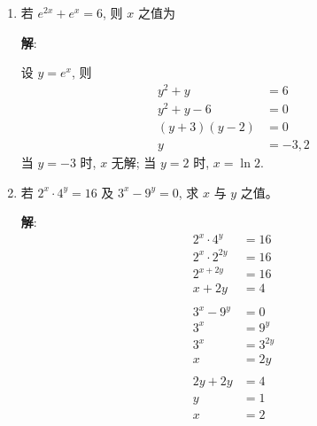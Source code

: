 \documentclass{report}
\newcommand{\sol}{\vspace{0.2cm}\textbf{解}:}
\begin{document}
\begin{multicols*}{2}
\begin{enumerate}
              \sol{}
              \begin{align*}
                  32^x   & = 16           \\
                  2^{5x} & = 2^4          \\
                  5x     & = 4            \\
                  x      & = \dfrac{4}{5}
              \end{align*}

        \item 若 $e^{2 x}+e^x=6$, 则 $x$ 之值为

              \sol{}

              设 $y = e^x$, 则
              \begin{align*}
                  y^2 + y        & = 6     \\
                  y^2 + y - 6    & = 0     \\
                  (y + 3)(y - 2) & = 0     \\
                  y              & = -3, 2
              \end{align*}
              当 $y = -3$ 时, $x$ 无解; 当 $y = 2$ 时, $x = \ln 2$.

        \item 若 $2^x \cdot 4^y=16$ 及 $3^x-9^y=0$, 求 $x$ 与 $y$ 之值。

              \sol{}
              \begin{align*}
                  2^x \cdot 4^y    & = 16     \\
                  2^x \cdot 2^{2y} & = 16     \\
                  2^{x+2y}         & = 16     \\
                  x + 2y           & = 4      \\
                  \\
                  3^x - 9^y        & = 0      \\
                  3^x              & = 9^y    \\
                  3^x              & = 3^{2y} \\
                  x                & = 2y     \\
                  \\
                  2y + 2y          & = 4      \\
                  y                & = 1      \\
                  x                & = 2
              \end{align*}


\end{enumerate}
\end{multicols*}
\end{document}
